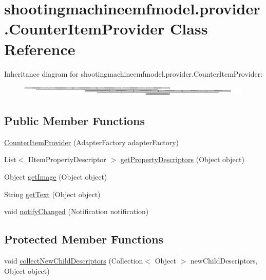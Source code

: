\hypertarget{classshootingmachineemfmodel_1_1provider_1_1_counter_item_provider}{\section{shootingmachineemfmodel.\-provider.\-Counter\-Item\-Provider Class Reference}
\label{classshootingmachineemfmodel_1_1provider_1_1_counter_item_provider}
}
Inheritance diagram for shootingmachineemfmodel.\-provider.\-Counter\-Item\-Provider\-:\begin{figure}[H]
\begin{center}
\leavevmode
\includegraphics[height=0.499109cm]{classshootingmachineemfmodel_1_1provider_1_1_counter_item_provider}
\end{center}
\end{figure}
\subsection*{Public Member Functions}
\begin{DoxyCompactItemize}
\item 
\hyperlink{classshootingmachineemfmodel_1_1provider_1_1_counter_item_provider_a5fc63f993b199f6f571e940a26da5747}{Counter\-Item\-Provider} (Adapter\-Factory adapter\-Factory)
\item 
List$<$ I\-Item\-Property\-Descriptor $>$ \hyperlink{classshootingmachineemfmodel_1_1provider_1_1_counter_item_provider_a23b9e805808e1cb64d555589d63acd0b}{get\-Property\-Descriptors} (Object object)
\item 
Object \hyperlink{classshootingmachineemfmodel_1_1provider_1_1_counter_item_provider_a33f74e7ffd23c53b88791ab29471439a}{get\-Image} (Object object)
\item 
String \hyperlink{classshootingmachineemfmodel_1_1provider_1_1_counter_item_provider_a167e515f30f387e99d0e5e9fb74785f3}{get\-Text} (Object object)
\item 
void \hyperlink{classshootingmachineemfmodel_1_1provider_1_1_counter_item_provider_a39b6a940abec030d9c2dea450bdfe82c}{notify\-Changed} (Notification notification)
\end{DoxyCompactItemize}
\subsection*{Protected Member Functions}
\begin{DoxyCompactItemize}
\item 
void \hyperlink{classshootingmachineemfmodel_1_1provider_1_1_counter_item_provider_aebb35bae6c1ba9afac8d97b651e97f60}{collect\-New\-Child\-Descriptors} (Collection$<$ Object $>$ new\-Child\-Descriptors, Object object)
\end{DoxyCompactItemize}


